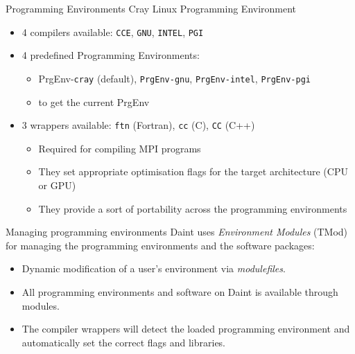 \begin{frame}[fragile]{Programming Environments}
  Cray Linux Programming Environment
  \begin{itemize}
  \item 4 compilers available: \texttt{CCE}, \texttt{GNU}, \texttt{INTEL}, \texttt{PGI}
  \item 4 predefined Programming Environments:
    \begin{itemize}
    \item PrgEnv-\texttt{cray} (default), \texttt{PrgEnv-gnu}, \texttt{PrgEnv-intel}, \texttt{PrgEnv-pgi}
    \item {} to get the current PrgEnv
    \end{itemize}
  \item 3 wrappers available: \texttt{ftn} (Fortran), \texttt{cc} (C), \texttt{CC} (C++)
    \begin{itemize}
    \item Required for compiling MPI programs
    \item They set appropriate optimisation flags for the target architecture (CPU or GPU)
    \item They provide a sort of portability across the programming environments
    \end{itemize}
  \end{itemize}
\end{frame}


\begin{frame}{Managing programming environments}
  Daint uses \emph{Environment Modules} (TMod) for managing the programming
  environments and the software packages:
  \vspace\baselineskip
  \begin{itemize}
  \item Dynamic modification of a user's environment via \emph{modulefiles}.
  \item All programming environments and software on Daint is available through modules.
  \item The compiler wrappers will detect the loaded programming environment
    and automatically set the correct flags and libraries.
  \end{itemize}
\end{frame}


